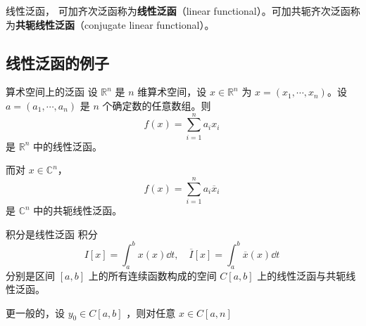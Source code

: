 \begin{definition}{线性泛函，}
可加齐次泛函称为\textbf{线性泛函}（linear functional）。可加共轭齐次泛函称为\textbf{共轭线性泛函}（conjugate linear functional）。
\end{definition}


\subsection{线性泛函的例子}

\begin{example}{算术空间上的泛函}
设 $\mathbb R^n$ 是 $n$ 维算术空间，设 $x\in\mathbb R^n$ 为 $x=(x_1,\cdots,x_n)$。设 $a=(a_1,\cdots,a_n)$ 是 $n$ 个确定数的任意数组。则
\begin{equation}
f(x)=\sum_{i=1}^n a_ix_i~
\end{equation}
是 $\mathbb R^n$ 中的线性泛函。

而对 $x\in\mathbb C^n$，
\begin{equation}
f(x)=\sum_{i=1}^n a_i\overline x_i~
\end{equation}
是  $\mathbb C^n$ 中的共轭线性泛函。

\end{example}


\begin{example}{积分是线性泛函}
积分
\begin{equation}
I[x]=\int_a^b x(x)\dd t,\quad \overline I[x]=\int_a^b \overline x(x)\dd t~
\end{equation}
分别是区间 $[a,b]$ 上的所有连续函数构成的空间 $C[a,b]$ 上的线性泛函与共轭线性泛函。
\end{example}

\begin{example}{}
更一般的，设 $y_0\in C[a,b]$ ，则对任意 $x\in C[a,n]$
\end{example}






